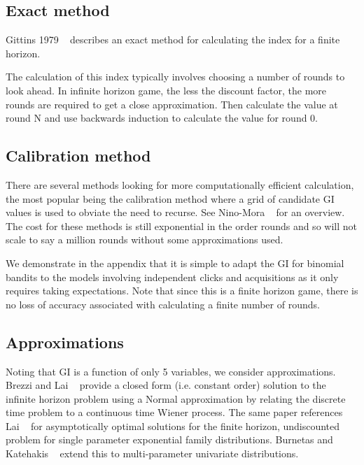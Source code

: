 \documentclass[11pt,a4,singlespacing,titlepagenumber=on]{scrreprt}
\numberwithin{equation}{chapter} %
\theoremstyle{remark}
\begin{document}
\subsection{ Exact method }

Gittins 1979 ~\cite{gittins1979bandit} describes an exact method for calculating the index for a finite horizon. 

The calculation of this index typically involves choosing a number of rounds to look ahead. In infinite horizon game, the less the discount factor, the more rounds are required to get a close approximation. Then calculate the value at round N and use backwards induction to calculate the value for round 0.

\subsection{ Calibration method }

There are several methods looking for more computationally efficient calculation, the most popular being the calibration method where a grid of candidate GI values is used to obviate the need to recurse. See Nino-Mora ~\cite{nino2011computing} for an overview. The cost for these methods is still exponential in the order rounds and so will not scale to say a million rounds without some approximations used.

We demonstrate in the appendix that it is simple to adapt the GI for binomial bandits to the models involving independent clicks and acquisitions as it only requires taking expectations. Note that since this is a finite horizon game, there is no loss of accuracy associated with calculating a finite number of rounds.

\subsection{ Approximations }

Noting that GI is a function of only 5 variables, we consider approximations. Brezzi and Lai ~\cite{brezzi2002optimal} provide a closed form (i.e. constant order) solution to the infinite horizon problem using a Normal approximation by relating the discrete time problem to a continuous time Wiener process.  The same paper references Lai ~\cite{lai1987adaptive} for asymptotically optimal solutions for the finite horizon, undiscounted problem for single parameter exponential family distributions. Burnetas and Katehakis ~\cite{burnetas1996optimal} extend this to multi-parameter univariate distributions.
\end{document}
